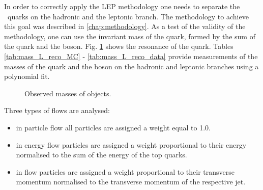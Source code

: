 \label{sec:LEP_methodology}
In order to correctly apply the LEP methodology one needs to separate the \cPqb\ quarks on the hadronic and the leptonic branch. The methodology to achieve this goal was described in \ref{chap:methodology}. As a test of the validity of the methodology, one can use the invariant mass of the \cPqt quark, formed by the sum of the \cPqb quark and the \PW boson. Fig. \ref{fig:L_jet_mass_reco} shows the resonance of the \cPqt quark. Tables \ref{tab:mass_L_reco_MC} - \ref{tab:mass_L_reco_data} provide measurements of the masses of the \cPqt quark and the \PW boson on the hadronic and leptonic branches using a polynomial fit.

  \begin{figure}[hbtp]
    \def\twidth{0.5}

 \caption{Observed masses of objects.}
  \label{fig:L_jet_mass_reco}
\end{figure}









Three types of flows are analysed:
\begin{itemize}
\item in particle flow all particles are assigned a weight equal to 1.0.
\item in energy flow particles are assigned a weight proportional to their energy normalised to the sum of the energy of the top quarks.
\item in \pt flow particles are assigned a weight proportional to their transverse momentum normalised to the transverse momentum of the respective jet.
\end{itemize}


